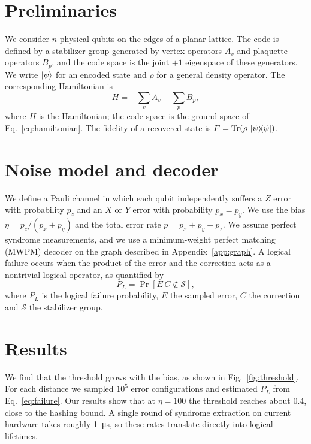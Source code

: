 \documentclass[aps,pra,twocolumn,superscriptaddress]{revtex4-2}
\begin{document}
\section{Preliminaries}\label{sec:prelim}
We consider $n$ physical qubits on the edges of a planar lattice. The code is defined by a stabilizer group generated by vertex operators $A_v$ and plaquette operators $B_p$, and the code space is the joint $+1$ eigenspace of these generators. We write $\ket{\psi}$ for an encoded state and $\rho$ for a general density operator.
The corresponding Hamiltonian is
\begin{equation}
  H = -\sum_{v} A_v - \sum_{p} B_p ,
  \label{eq:hamiltonian}
\end{equation}
where $H$ is the Hamiltonian; the code space is the ground space of Eq.~\eqref{eq:hamiltonian}. The fidelity of a recovered state is $F = \Tr(\rho \, \dyad{\psi})$.

\section{Noise model and decoder}\label{sec:methods}
We define a Pauli channel in which each qubit independently suffers a $Z$ error with probability $p_z$ and an $X$ or $Y$ error with probability $p_x = p_y$. We use the bias $\eta = p_z / (p_x + p_y)$ and the total error rate $p = p_x + p_y + p_z$. We assume perfect syndrome measurements, and we use a minimum-weight perfect matching (MWPM) decoder on the graph described in Appendix~\ref{app:graph}. A logical failure occurs when the product of the error and the correction acts as a nontrivial logical operator, as quantified by
\begin{equation}
  P_L = \Pr\left[ E \, C \notin \mathcal{S} \right] ,
  \label{eq:failure}
\end{equation}
where $P_L$ is the logical failure probability, $E$ the sampled error, $C$ the correction and $\mathcal{S}$ the stabilizer group.

\section{Results}\label{sec:results}
We find that the threshold grows with the bias, as shown in Fig.~\ref{fig:threshold}. For each distance we sampled $10^5$ error configurations and estimated $P_L$ from Eq.~\eqref{eq:failure}. Our results show that at $\eta = 100$ the threshold reaches about $0.4$, close to the hashing bound. A single round of syndrome extraction on current hardware takes roughly \qty{1}{\micro\second}, so these rates translate directly into logical lifetimes.
\end{document}
